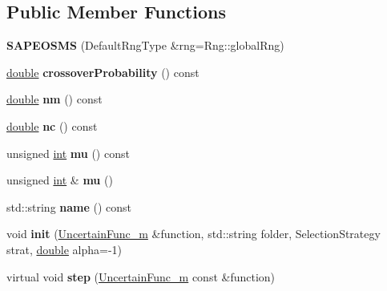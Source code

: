 \subsection*{Public Member Functions}
\begin{DoxyCompactItemize}
\item 
{\bfseries S\+A\+P\+E\+O\+S\+MS} (Default\+Rng\+Type \&rng=Rng\+::global\+Rng)\hypertarget{classSAPEOSMS_abc76923accdbed46008f69724194d118}{}\label{classSAPEOSMS_abc76923accdbed46008f69724194d118}

\item 
\hyperlink{classdouble}{double} {\bfseries crossover\+Probability} () const \hypertarget{classSAPEOSMS_ac3a8972c9c4bc2e655a0c78c99a21c91}{}\label{classSAPEOSMS_ac3a8972c9c4bc2e655a0c78c99a21c91}

\item 
\hyperlink{classdouble}{double} {\bfseries nm} () const \hypertarget{classSAPEOSMS_a28f1d3803d546896d2feb44b05e38e24}{}\label{classSAPEOSMS_a28f1d3803d546896d2feb44b05e38e24}

\item 
\hyperlink{classdouble}{double} {\bfseries nc} () const \hypertarget{classSAPEOSMS_a97b4b0e4dd7727ba8c7dfcde295cce55}{}\label{classSAPEOSMS_a97b4b0e4dd7727ba8c7dfcde295cce55}

\item 
unsigned \hyperlink{classint}{int} {\bfseries mu} () const \hypertarget{classSAPEOSMS_a193c261f69f5992bc7632c6bb0495fb7}{}\label{classSAPEOSMS_a193c261f69f5992bc7632c6bb0495fb7}

\item 
unsigned \hyperlink{classint}{int} \& {\bfseries mu} ()\hypertarget{classSAPEOSMS_aa6dcfe84609f38dfdb5f644f85053842}{}\label{classSAPEOSMS_aa6dcfe84609f38dfdb5f644f85053842}

\item 
std\+::string {\bfseries name} () const \hypertarget{classSAPEOSMS_ac27f25c0cb4749b7f3a9ab343ff19ca6}{}\label{classSAPEOSMS_ac27f25c0cb4749b7f3a9ab343ff19ca6}

\item 
void {\bfseries init} (\hyperlink{classUncertainFunc__m}{Uncertain\+Func\+\_\+m} \&function, std\+::string folder, Selection\+Strategy strat, \hyperlink{classdouble}{double} alpha=-\/1)\hypertarget{classSAPEOSMS_aeb9b033919873de6c9a40f51046c347a}{}\label{classSAPEOSMS_aeb9b033919873de6c9a40f51046c347a}

\item 
virtual void {\bfseries step} (\hyperlink{classUncertainFunc__m}{Uncertain\+Func\+\_\+m} const \&function)\hypertarget{classSAPEOSMS_adbf6e80fa8987a6e961e1b7a6fc5fd5f}{}\label{classSAPEOSMS_adbf6e80fa8987a6e961e1b7a6fc5fd5f}


\end{DoxyCompactItemize}
